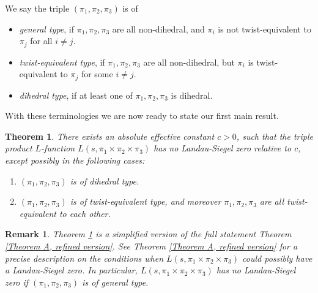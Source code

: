 \documentclass[12pt]{amsart}
\newtheorem{remark}{Remark}[section]
\newtheorem{thmx}{Theorem}
\begin{document}
We say the triple $(\pi_1,\pi_2,\pi_3)$ is of 
\begin{itemize}
    \item \textit{general type}, if $\pi_1,\pi_2,\pi_3$ are all non-dihedral, and $\pi_i$ is not twist-equivalent to $\pi_j$ for all $i \neq j$.
    \item \textit{twist-equivalent type}, if $\pi_1,\pi_2,\pi_3$ are all non-dihedral, but $\pi_i$ is twist-equivalent to $\pi_j$ for some $i \neq j$.
    \item \textit{dihedral type}, if at least one of $\pi_1,\pi_2,\pi_3$ is dihedral. 
\end{itemize}

With these terminologies we are now ready to state our first main result. 
\begin{thmx}\label{Theorem A}
    There exists an absolute effective constant $c>0$, such that the triple product $L$-function $L(s,\pi_1 \times \pi_2 \times \pi_3)$ has no Landau-Siegel zero relative to $c$, except possibly in the following cases:
    \begin{enumerate}
        \item $(\pi_1,\pi_2,\pi_3)$ is of dihedral type.
        \item $(\pi_1,\pi_2,\pi_3)$ is of twist-equivalent type, and moreover $\pi_1,\pi_2,\pi_3$ are all twist-equivalent to each other.
    \end{enumerate}
\end{thmx}

\begin{remark}
    Theorem \ref{Theorem A} is a simplified version of the full statement Theorem \ref{Theorem A, refined version}. See Theorem \ref{Theorem A, refined version} for a precise description on the conditions when $L(s,\pi_1 \times \pi_2 \times \pi_3)$ could possibly have a Landau-Siegel zero. In particular, $L(s,\pi_1 \times \pi_2 \times \pi_3)$ has no Landau-Siegel zero if $(\pi_1,\pi_2,\pi_3)$ is of general type.
\end{remark}
\end{document}
